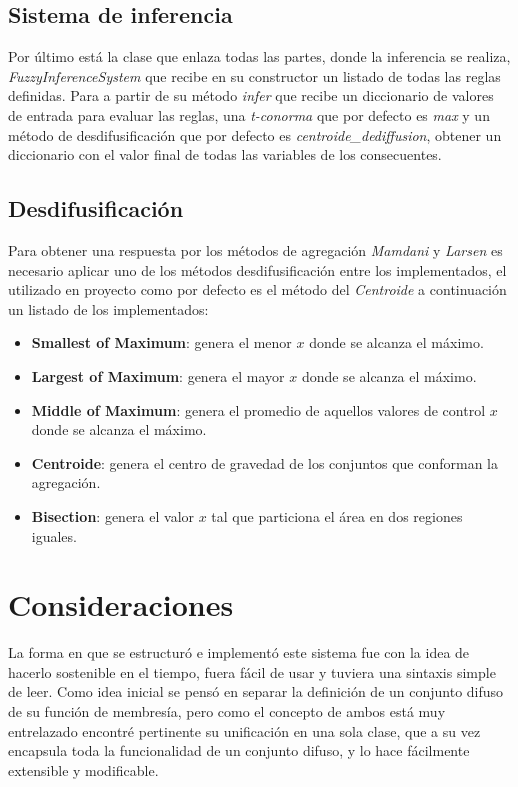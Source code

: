 \documentclass[a4paper,10pt,twocolumn]{article}
\begin{document}
\subsection*{Sistema de inferencia}
	Por \'ultimo est\'a la clase que enlaza todas las partes, donde la inferencia se realiza, \textit{FuzzyInferenceSystem}
	que recibe en su constructor un listado de todas las reglas definidas. Para a partir de su m\'etodo \textit{infer} que recibe un diccionario de valores de entrada para evaluar las reglas, una \textit{t-conorma} que por defecto es \textit{max} y un m\'etodo de desdifusificaci\'on que por defecto es \textit{centroide\_dediffusion}, obtener un diccionario con el valor final de todas las variables de los consecuentes.

 \subsection*{Desdifusificaci\'on}
 
 Para obtener una respuesta por los m\'etodos de agregaci\'on \textit{Mamdani} y \textit{Larsen} es necesario aplicar uno de los m\'etodos desdifusificaci\'on entre los implementados, el utilizado en proyecto como por defecto es el m\'etodo del \textit{Centroide} a continuaci\'on un listado de los implementados:
 
 \begin{itemize}
 	\item \textbf{Smallest of Maximum}: genera el menor $x$ donde se alcanza el m\'aximo.
 	\item \textbf{Largest of Maximum}: genera el mayor $x$ donde se alcanza el m\'aximo.
 	\item \textbf{Middle of Maximum}: genera el promedio de aquellos valores de control $x$ donde se alcanza el m\'aximo.
 	\item \textbf{Centroide}: genera el centro de gravedad de los conjuntos que conforman la agregaci\'on.
 	\item \textbf{Bisection}: genera el valor $x$ tal que particiona el \'area en dos regiones iguales.
 
 \end{itemize}
\section{Consideraciones}
La forma en que se estructur\'o e implement\'o este sistema fue con la idea de hacerlo sostenible en el tiempo, fuera f\'acil de usar y tuviera una sintaxis simple de leer. Como idea inicial se pens\'o en separar la definici\'on de un conjunto difuso de su funci\'on de membres\'ia, pero como el concepto de ambos est\'a muy entrelazado encontr\'e pertinente su unificaci\'on en una sola clase, que a su vez encapsula toda la funcionalidad de un conjunto difuso, y lo hace f\'acilmente extensible y modificable.
  
\end{document}
